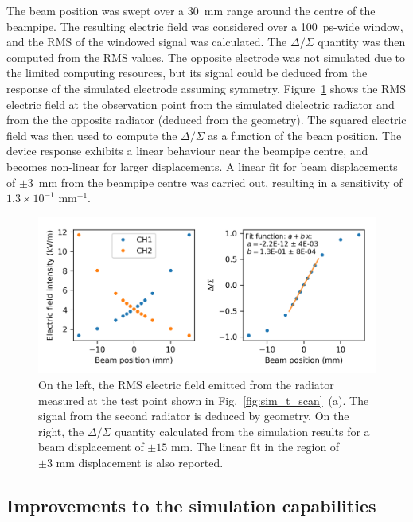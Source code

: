 The beam position was swept over a 30~mm range around the centre of the beampipe. The resulting electric field was considered over a 100~ps-wide window, and the RMS of the windowed signal was calculated. The $\Delta/\Sigma$ quantity was then computed from the RMS values. The opposite electrode was not simulated due to the limited computing resources, but its signal could be deduced from the response of the simulated electrode assuming symmetry. Figure~\ref{fig:sim_delta_sigma} shows the RMS electric field at the observation point from the simulated dielectric radiator and from the the opposite radiator (deduced from the geometry). The squared electric field was then used to compute the $\Delta/\Sigma$ as a function of the beam position. The device response exhibits a linear behaviour near the beampipe centre, and becomes non-linear for larger displacements. A linear fit for beam displacements of $\pm 3$~mm from the beampipe centre was carried out, resulting in a sensitivity of $1.3\times10^{-1} \text{ mm}^{-1}$.

\begin{figure}[!h]
\centering
\includegraphics[scale=1, keepaspectratio]{pictures/sim_delta_sigma_both.png}
\caption{On the left, the RMS electric field emitted from the radiator measured at the test point shown in Fig.~\ref{fig:sim_t_scan}~(a). The signal from the second radiator is deduced by geometry. On the right, the  $\Delta/\Sigma$ quantity calculated from the simulation results for a beam displacement of $\pm15\text{ mm}$. The linear fit in the region of $\pm3\text{ mm}$ displacement is also reported.}\label{fig:sim_delta_sigma}

\end{figure}




\subsection[Improvements to the simulation capabilities]{Improvements to the simulation capabilities}

